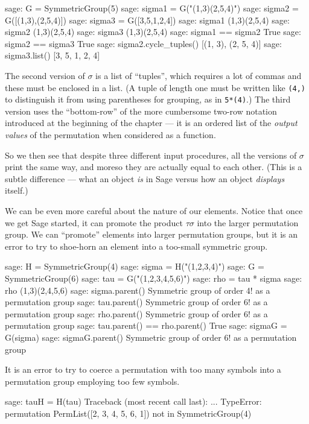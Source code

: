 %
\begin{sageexample}
sage: G = SymmetricGroup(5)
sage: sigma1 = G("(1,3)(2,5,4)")
sage: sigma2 = G([(1,3),(2,5,4)])
sage: sigma3 = G([3,5,1,2,4])
sage: sigma1
(1,3)(2,5,4)
sage: sigma2
(1,3)(2,5,4)
sage: sigma3
(1,3)(2,5,4)
sage: sigma1 == sigma2
True
sage: sigma2 == sigma3
True
sage: sigma2.cycle_tuples()
[(1, 3), (2, 5, 4)]
sage: sigma3.list()
[3, 5, 1, 2, 4]
\end{sageexample}
%
The second version of $\sigma$ is a list of ``tuples'', which requires a lot of commas and these must be enclosed in a list.  (A tuple of length one must be written like \verb?(4,)? to distinguish it from using parentheses for grouping, as in \verb?5*(4)?.)  The third version uses the ``bottom-row'' of the more cumbersome two-row notation introduced at the beginning of the chapter --- it is an ordered list of the \emph{output values} of the permutation when considered as a function.\par
%
So we then see that despite three different input procedures, all the versions of $\sigma$ print the same way, and moreso they are actually equal to each other.  (This is a subtle difference --- what an object \emph{is} in Sage versus how an object \emph{displays} itself.)\par
%
We can be even more careful about the nature of our elements.  Notice that once we get Sage started, it can promote the product $\tau\sigma$ into the larger permutation group.  We can ``promote'' elements into larger permutation groups, but it is an error to try to shoe-horn an element into a too-small symmetric group.
%
\begin{sageexample}
sage: H = SymmetricGroup(4)
sage: sigma = H("(1,2,3,4)")
sage: G = SymmetricGroup(6)
sage: tau = G("(1,2,3,4,5,6)")
sage: rho = tau * sigma
sage: rho
(1,3)(2,4,5,6)
sage: sigma.parent()
Symmetric group of order 4! as a permutation group
sage: tau.parent()
Symmetric group of order 6! as a permutation group
sage: rho.parent()
Symmetric group of order 6! as a permutation group
sage: tau.parent() == rho.parent()
True
sage: sigmaG = G(sigma)
sage: sigmaG.parent()
Symmetric group of order 6! as a permutation group
\end{sageexample}
%
It is an error to try to coerce a permutation with too many symbols into a permutation group employing too few symbols.
%
\begin{sageexample}
sage: tauH = H(tau)
Traceback (most recent call last):
...
TypeError: permutation PermList([2, 3, 4, 5, 6, 1]) not in SymmetricGroup(4)
\end{sageexample}
